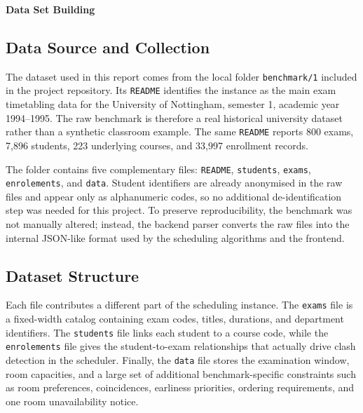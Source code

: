 \newpage
{}
{}
{\large\bfseries Data Set Building}
\vspace{2pt}
\titlerule
\vspace{6pt}
\label{sec:data}

\subsection{Data Source and Collection}

The dataset used in this report comes from the local folder
\texttt{benchmark/1} included in the project repository. Its
\texttt{README} identifies the instance as the main exam timetabling data
for the University of Nottingham, semester 1, academic year 1994--1995.
The raw benchmark is therefore a real historical university dataset
rather than a synthetic classroom example. The same \texttt{README}
reports 800 exams, 7{,}896 students, 223 underlying courses, and
33{,}997 enrollment records.

The folder contains five complementary files: \texttt{README},
\texttt{students}, \texttt{exams}, \texttt{enrolements}, and
\texttt{data}. Student identifiers are already anonymised in the raw
files and appear only as alphanumeric codes, so no additional
de-identification step was needed for this project. To preserve
reproducibility, the benchmark was not manually altered; instead, the
backend parser converts the raw files into the internal JSON-like format
used by the scheduling algorithms and the frontend.

\subsection{Dataset Structure}

Each file contributes a different part of the scheduling instance. The
\texttt{exams} file is a fixed-width catalog containing exam codes,
titles, durations, and department identifiers. The \texttt{students}
file links each student to a course code, while the
\texttt{enrolements} file gives the student-to-exam relationships that
actually drive clash detection in the scheduler. Finally, the
\texttt{data} file stores the examination window, room capacities, and a
large set of additional benchmark-specific constraints such as room
preferences, coincidences, earliness priorities, ordering requirements,
and one room unavailability notice.


